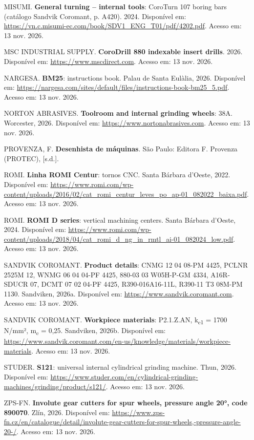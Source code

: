 \noindent MISUMI. \textbf{General turning – internal tools}: CoroTurn 107 boring bars (catálogo Sandvik Coromant, p. A420). 2024. Disponível em: \url{https://vn.c.misumi-ec.com/book/SDV1_ENG_T01/pdf/4202.pdf}. Acesso em: 13 nov. 2026.

\noindent MSC INDUSTRIAL SUPPLY. \textbf{CoroDrill 880 indexable insert drills}. 2026. Disponível em: \url{https://www.mscdirect.com}. Acesso em: 13 nov. 2026.

\noindent NARGESA. \textbf{BM25}: instructions book. Palau de Santa Eulàlia, 2026. Disponível em: \url{https://nargesa.com/sites/default/files/instructions-book-bm25_5.pdf}. Acesso em: 13 nov. 2026.

\noindent NORTON ABRASIVES. \textbf{Toolroom and internal grinding wheels}: 38A. Worcester, 2026. Disponível em: \url{https://www.nortonabrasives.com}. Acesso em: 13 nov. 2026.

\noindent PROVENZA, F. \textbf{Desenhista de máquinas}. São Paulo: Editora F. Provenza (PROTEC), [s.d.].

\noindent ROMI. \textbf{Linha ROMI Centur}: tornos CNC. Santa Bárbara d'Oeste, 2022. Disponível em: \url{https://www.romi.com/wp-content/uploads/2016/02/cat_romi_centur_leves_po_ap-01_082022_baixa.pdf}. Acesso em: 13 nov. 2026.

\noindent ROMI. \textbf{ROMI D series}: vertical machining centers. Santa Bárbara d'Oeste, 2024. Disponível em: \url{https://www.romi.com/wp-content/uploads/2018/04/cat_romi_d_ng_in_rmtl_ai-01_082024_low.pdf}. Acesso em: 13 nov. 2026.

\noindent SANDVIK COROMANT. \textbf{Product details}: CNMG 12 04 08-PM 4425, PCLNR 2525M 12, WNMG 06 04 04-PF 4425, 880-03 03 W05H-P-GM 4334, A16R-SDUCR 07, DCMT 07 02 04-PF 4425, R390-016A16-11L, R390-11 T3 08M-PM 1130. Sandviken, 2026a. Disponível em: \url{https://www.sandvik.coromant.com}. Acesso em: 13 nov. 2026.

\noindent SANDVIK COROMANT. \textbf{Workpiece materials}: P2.1.Z.AN, k\textsubscript{c1} = 1700 N/mm², m\textsubscript{c} = 0,25. Sandviken, 2026b. Disponível em: \url{https://www.sandvik.coromant.com/en-us/knowledge/materials/workpiece-materials}. Acesso em: 13 nov. 2026.

\noindent STUDER. \textbf{S121}: universal internal cylindrical grinding machine. Thun, 2026. Disponível em: \url{https://www.studer.com/en/cylindrical-grinding-machines/grinding/product/s121/}. Acesso em: 13 nov. 2026.

\noindent ZPS-FN. \textbf{Involute gear cutters for spur wheels, pressure angle 20°, code 890070}. Zlín, 2026. Disponível em: \url{https://www.zps-fn.cz/en/catalogue/detail/involute-gear-cutters-for-spur-wheels,-pressure-angle-20-/}. Acesso em: 13 nov. 2026.
